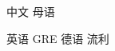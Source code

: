 \begin{cvskills}

  \cvskill
    {中文} %
    {母语} %

  \cvskill
    {英语} %
    {GRE} %
  \cvskill
    {德语} %
    {流利} %
    

\end{cvskills}
